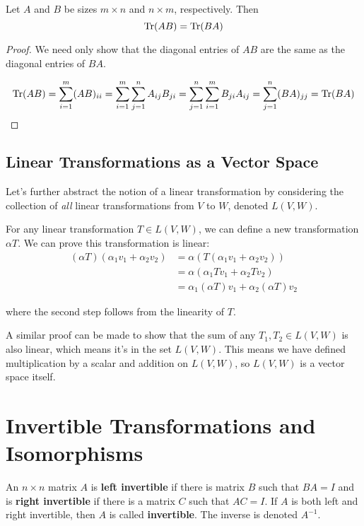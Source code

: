 \begin{theorem}
Let $A$ and $B$ be sizes $m \times n$ and $n \times m$, respectively. Then $$\Trace(AB) = \Trace(BA)$$
\end{theorem}

\begin{proof}
We need only show that the diagonal entries of $AB$ are the same as the diagonal entries of $BA$. 

$$\Trace(AB) = \sum_{i=1}^{m} (AB)_{ii} = \sum_{i=1}^{m} \sum_{j=1}^{n} A_{ij} B_{ji} = \sum_{j=1}^{n} \sum_{i=1}^{m} B_{ji} A_{ij} = \sum_{j=1}^{n} (BA)_{jj} = \Trace(BA)$$
\end{proof}

\subsection{Linear Transformations as a Vector Space}

Let's further abstract the notion of a linear transformation by considering the collection of \textit{all} linear transformations from $V$ to $W$, denoted $L(V, W)$. 

For any linear transformation $T \in L(V, W)$, we can define a new transformation $\alpha T$. We can prove this transformation is linear: 
$$
\begin{aligned} 
(\alpha T)(\alpha_{1} v_{1} + \alpha_{2} v_{2}) &= \alpha (T(\alpha_{1} v_{1} + \alpha_{2} v_{2})) \\
&= \alpha (\alpha_{1}Tv_{1} + \alpha_{2}Tv_{2}) \\
&= \alpha_{1} (\alpha T) v_{1} + \alpha_{2} (\alpha T) v_{2}
\end{aligned}
$$

where the second step follows from the linearity of $T$. 

A similar proof can be made to show that the sum of any $T_{1}, T_{2} \in L(V, W)$ is also linear, which means it's in the set $L(V, W)$. This means we have defined multiplication by a scalar and addition on $L(V, W)$, so $L(V, W)$ is a vector space itself. 

\section{Invertible Transformations and Isomorphisms}
\begin{definition}
An $n \times n$ matrix $A$ is \textbf{left invertible} if there is matrix $B$ such that $BA = I$ and is \textbf{right invertible} if there is a matrix $C$ such that $AC = I$. If $A$ is both left and right invertible, then $A$ is called \textbf{invertible}. The inverse is denoted $A^{-1}$. 
\end{definition}

